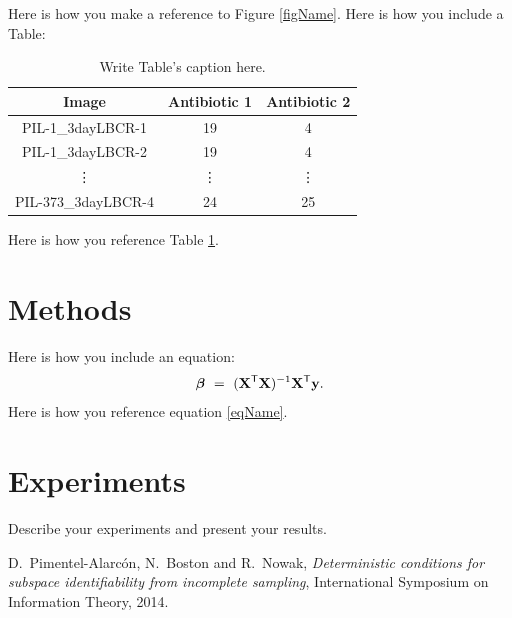 \documentclass[conference]{IEEEtran}
\def \X{\boldsymbol{\rm X}}
\def \y{\boldsymbol{\rm y}}
\def \bbeta{\boldsymbol{\beta}}
\def \T{\mathsf{T}}
\begin{document}
Here is how you make a reference to Figure \ref{figName}. Here is how you include a Table:

\begin{table}[h]
\begin{center}
\begin{tabular}{| c || c | c |}
\hline
Image & Antibiotic 1 & Antibiotic 2 \\ \hline \hline
PIL-1\_3dayLBCR-1 & 19 & 4 \\ \hline
PIL-1\_3dayLBCR-2 & 19 & 4 \\ \hline
\vdots & \vdots & \vdots \\ \hline
PIL-373\_3dayLBCR-4 & 24 & 25 \\ \hline
\end{tabular}
\caption{Write Table's caption here.}
\label{tabName}
\end{center}
\end{table}

Here is how you reference Table \ref{tabName}.

\section{Methods}
Here is how you include an equation:
\begin{align}
\label{eqName}
\bbeta \ = \ (\X^\T\X)^{-1}\X^\T\y.
\end{align}
Here is how you reference equation \eqref{eqName}.



\section{Experiments}
Describe your experiments and present your results.

\begin{thebibliography}{1}

D.~Pimentel-Alarc\'on, N.~Boston and R.~Nowak, \emph{Deterministic conditions for subspace identifiability from incomplete sampling}, International Symposium on Information Theory, 2014.

\end{thebibliography}
\end{document}
